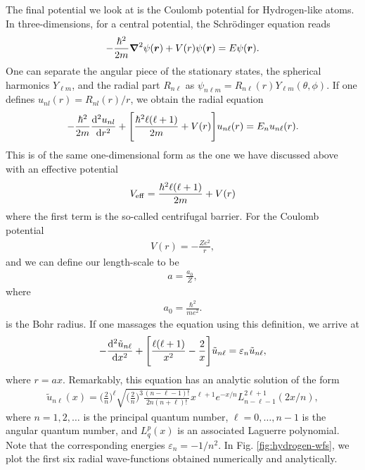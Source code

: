 The final potential we look at is the Coulomb potential for Hydrogen-like atoms.
In three-dimensions, for a central potential, the Schr\"{o}dinger equation reads
\begin{align}
    -\frac{\hbar^2}{2m} \grad^2 \psi(\vb*{r}) + V(r) \psi(\vb*{r}) = E \psi(\vb*{r})
.\end{align}
One can separate the angular piece of the stationary states, the spherical harmonics $Y_{\ell m}$, and the radial part $R_{n \ell}$ as $\psi_{n \ell m} = R_{n \ell}(r) Y_{\ell m}(\theta,\phi)$.
If one defines $u_{nl}(r) = R_{nl}(r) / r$, we obtain the radial equation
\begin{align}
    -\frac{\hbar^2}{2m} \dv[2]{u_{nl}}{r} + \Bigg[ \frac{\hbar^2 \ell(\ell + 1)}{2m} + V(r) \Bigg] u_{n \ell}(r) = E_{n} u_{n \ell}(r)
.\end{align}
This is of the same one-dimensional form as the one we have discussed above with an effective potential
\begin{align}
    V_{\rm eff} = \frac{\hbar^2 \ell (\ell + 1)}{2m} + V(r)
\end{align}
where the first term is the so-called centrifugal barrier.
For the Coulomb potential
\begin{align}
    V(r) = -\frac{Z e^2}{r}
,\end{align}
and we can define our length-scale to be 
\begin{align}
    a = \frac{a_0}{Z}
,\end{align}
where 
\begin{align}
    a_0 = \frac{\hbar^2}{m e^2}
.\end{align}
is the Bohr radius.
If one massages the equation using this definition, we arrive at
\begin{align}
    -\dv[2]{\tilde{u}_{n\ell}}{x} + \Bigg[ \frac{\ell (\ell + 1)}{x^2} - \frac{2}{x} \Bigg] \tilde{u}_{n \ell} = \varepsilon_{n} \tilde{u}_{n \ell}
,\end{align}
where $r = a x$.
Remarkably, this equation has an analytic solution of the form
\begin{align}
    \tilde{u}_{n \ell}(x) = \Big( \frac{2}{n} \Big)^{\ell} \sqrt{\Big( \frac{2}{n} \Big)^3 \frac{(n - \ell - 1)!}{2n (n + \ell)!}} x^{\ell + 1} e^{-x/n} L_{n-\ell-1}^{2 \ell + 1}(2x/n)
,\end{align}
where $n = 1,2,\ldots$ is the principal quantum number, $\ell = 0,\ldots,n-1$ is the angular quantum number, and $L_{q}^{p}(x)$ is an associated Laguerre polynomial.
Note that the corresponding energies $\varepsilon_{n} = -1/n^2$.
In Fig. \ref{fig:hydrogen-wfs}, we plot the first six radial wave-functions obtained numerically and analytically.

